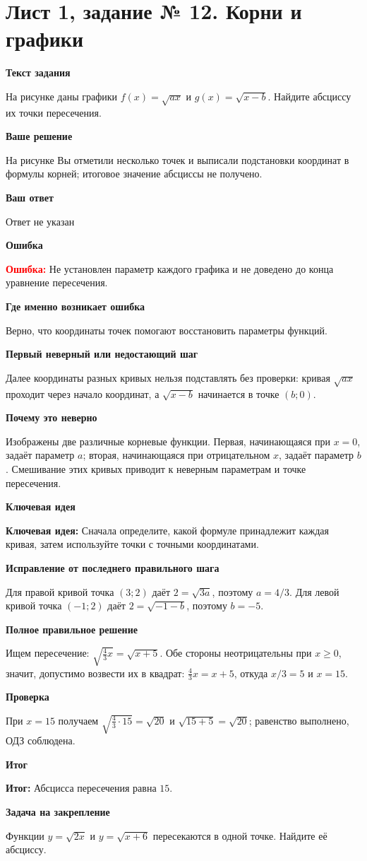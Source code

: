 \documentclass[11pt,a4paper]{article}
\newcommand{\Idea}{\textcolor{blue!60!black}{\textbf{Ключевая идея:}}}
\newcommand{\Res}{\textcolor{teal!60!black}{\textbf{Итог:}}}
\newcommand{\Heading}[2]{\par\medskip\textbf{#1}\par#2\par}
\begin{document}
\section*{Лист 1, задание № 12. Корни и графики}
\Heading{Текст задания}{На рисунке даны графики $f(x)=\sqrt{ax}$ и $g(x)=\sqrt{x-b}$. Найдите абсциссу их точки пересечения.}
\Heading{Ваше решение}{На рисунке Вы отметили несколько точек и выписали подстановки координат в формулы корней; итоговое значение абсциссы не получено.}
\Heading{Ваш ответ}{Ответ не указан}
\Heading{Ошибка}{\textcolor{red}{\textbf{Ошибка:}} Не установлен параметр каждого графика и не доведено до конца уравнение пересечения.}
\Heading{Где именно возникает ошибка}{Верно, что координаты точек помогают восстановить параметры функций.}
\Heading{Первый неверный или недостающий шаг}{Далее координаты разных кривых нельзя подставлять без проверки: кривая $\sqrt{ax}$ проходит через начало координат, а $\sqrt{x-b}$ начинается в точке $(b;0)$.}
\Heading{Почему это неверно}{Изображены две различные корневые функции. Первая, начинающаяся при $x=0$, задаёт параметр $a$; вторая, начинающаяся при отрицательном $x$, задаёт параметр $b$. Смешивание этих кривых приводит к неверным параметрам и точке пересечения.}
\Heading{Ключевая идея}{\Idea{} Сначала определите, какой формуле принадлежит каждая кривая, затем используйте точки с точными координатами.}
\Heading{Исправление от последнего правильного шага}{Для правой кривой точка $(3;2)$ даёт $2=\sqrt{3a}$, поэтому $a=4/3$. Для левой кривой точка $(-1;2)$ даёт $2=\sqrt{-1-b}$, поэтому $b=-5$.}
\Heading{Полное правильное решение}{Ищем пересечение: $\sqrt{\frac43x}=\sqrt{x+5}$. Обе стороны неотрицательны при $x\ge0$, значит, допустимо возвести их в квадрат: $\frac43x=x+5$, откуда $x/3=5$ и $x=15$.}
\Heading{Проверка}{При $x=15$ получаем $\sqrt{\frac43\cdot15}=\sqrt{20}$ и $\sqrt{15+5}=\sqrt{20}$; равенство выполнено, ОДЗ соблюдена.}
\Heading{Итог}{\Res{} Абсцисса пересечения равна $15$.}
\Heading{Задача на закрепление}{Функции $y=\sqrt{2x}$ и $y=\sqrt{x+6}$ пересекаются в одной точке. Найдите её абсциссу.}
\newpage
{}\label{task:1_13}
\end{document}
